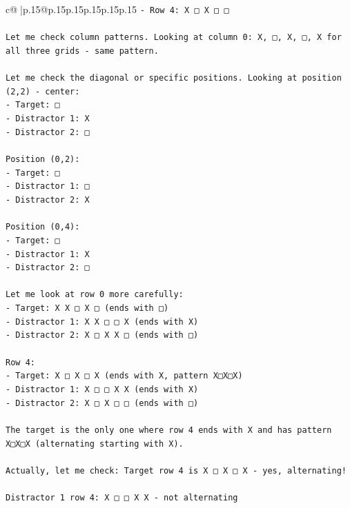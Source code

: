 \documentclass{article}
\begin{document}
{\begin{supertabular}{c@{$\;$}|p{.15\linewidth}@{}p{.15\linewidth}p{.15\linewidth}p{.15\linewidth}p{.15\linewidth}p{.15\linewidth}}
{{{\texttt{{-} Row 4: X □ X □ □} \\
\\ 
\texttt{Let me check column patterns. Looking at column 0: X, □, X, □, X for all three grids {-} same pattern.} \\
\\ 
\texttt{Let me check the diagonal or specific positions. Looking at position (2,2) {-} center:} \\
\texttt{{-} Target: □} \\
\texttt{{-} Distractor 1: X} \\
\texttt{{-} Distractor 2: □} \\
\\ 
\texttt{Position (0,2):} \\
\texttt{{-} Target: □} \\
\texttt{{-} Distractor 1: □} \\
\texttt{{-} Distractor 2: X} \\
\\ 
\texttt{Position (0,4):} \\
\texttt{{-} Target: □} \\
\texttt{{-} Distractor 1: X} \\
\texttt{{-} Distractor 2: □} \\
\\ 
\texttt{Let me look at row 0 more carefully:} \\
\texttt{{-} Target: X X □ X □ (ends with □)} \\
\texttt{{-} Distractor 1: X X □ □ X (ends with X)} \\
\texttt{{-} Distractor 2: X □ X X □ (ends with □)} \\
\\ 
\texttt{Row 4:} \\
\texttt{{-} Target: X □ X □ X (ends with X, pattern X□X□X)} \\
\texttt{{-} Distractor 1: X □ □ X X (ends with X)} \\
\texttt{{-} Distractor 2: X □ X □ □ (ends with □)} \\
\\ 
\texttt{The target is the only one where row 4 ends with X and has pattern X□X□X (alternating starting with X).} \\
\\ 
\texttt{Actually, let me check: Target row 4 is X □ X □ X {-} yes, alternating!} \\
\\ 
\texttt{Distractor 1 row 4: X □ □ X X {-} not alternating} \\
}}}
\end{supertabular}}
\end{document}
